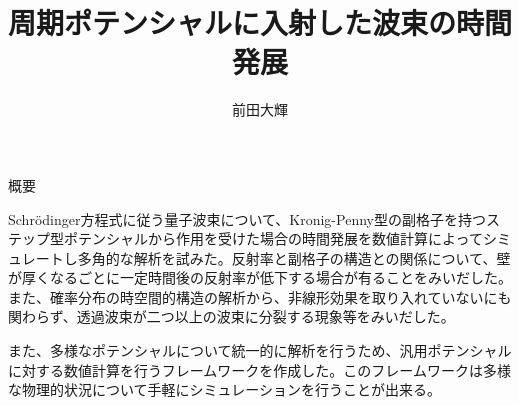 \documentclass[a4paper, lualatex]{bxjsarticle}
\title{周期ポテンシャルに入射した波束の時間発展}
\author{前田大輝}
\begin{document}
\maketitle
\tableofcontents
\begin{section}{概要}
    \par Schrödinger方程式に従う量子波束について、Kronig-Penny型の副格子を持つステップ型ポテンシャルから作用を受けた場合の時間発展を数値計算によってシミュレートし多角的な解析を試みた。反射率と副格子の構造との関係について、壁が厚くなるごとに一定時間後の反射率が低下する場合が有ることをみいだした。また、確率分布の時空間的構造の解析から、非線形効果を取り入れていないにも関わらず、透過波束が二つ以上の波束に分裂する現象等をみいだした。
    \par また、多様なポテンシャルについて統一的に解析を行うため、汎用ポテンシャルに対する数値計算を行うフレームワークを作成した。このフレームワークは多様な物理的状況について手軽にシミュレーションを行うことが出来る。
\end{section}
\end{document}
